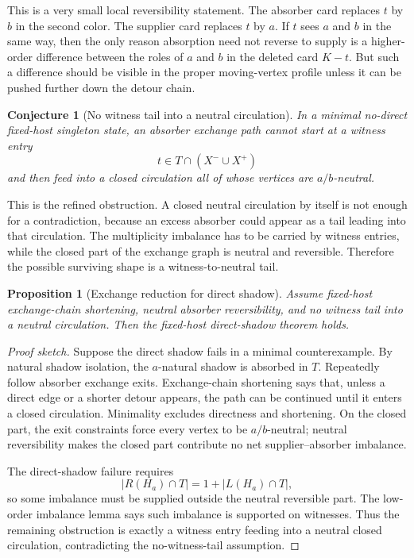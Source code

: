 \documentclass[11pt]{article}
\newtheorem{proposition}{Proposition}
\newtheorem{conjecture}{Conjecture}
\begin{document}
This is a very small local reversibility statement.  The absorber card
replaces \(t\) by \(b\) in the second color.  The supplier card replaces \(t\)
by \(a\).  If \(t\) sees \(a\) and \(b\) in the same way, then the only reason
absorption need not reverse to supply is a higher-order difference between
the roles of \(a\) and \(b\) in the deleted card \(K-t\).  But such a
difference should be visible in the proper moving-vertex profile unless it
can be pushed further down the detour chain.

\begin{conjecture}[No witness tail into a neutral circulation]
In a minimal no-direct fixed-host singleton state, an absorber exchange path
cannot start at a witness entry
\[
  t\in T\cap(X^-\cup X^+)
\]
and then feed into a closed circulation all of whose vertices are
\(a/b\)-neutral.
\end{conjecture}

This is the refined obstruction.  A closed neutral circulation by itself is
not enough for a contradiction, because an excess absorber could appear as a
tail leading into that circulation.  The multiplicity imbalance has to be
carried by witness entries, while the closed part of the exchange graph is
neutral and reversible.  Therefore the possible surviving shape is a
witness-to-neutral tail.

\begin{proposition}[Exchange reduction for direct shadow]
Assume fixed-host exchange-chain shortening, neutral absorber reversibility,
and no witness tail into a neutral circulation.  Then the fixed-host
direct-shadow theorem holds.
\end{proposition}

\begin{proof}[Proof sketch]
Suppose the direct shadow fails in a minimal counterexample.  By natural
shadow isolation, the \(a\)-natural shadow is absorbed in \(T\).  Repeatedly
follow absorber exchange exits.  Exchange-chain shortening says that, unless
a direct edge or a shorter detour appears, the path can be continued until it
enters a closed circulation.  Minimality excludes directness and shortening.
On the closed part, the exit constraints force every vertex to be
\(a/b\)-neutral; neutral reversibility makes the closed part contribute no
net supplier--absorber imbalance.

The direct-shadow failure requires
\[
  |R(H_a)\cap T|=1+|L(H_a)\cap T|,
\]
so some imbalance must be supplied outside the neutral reversible part.  The
low-order imbalance lemma says such imbalance is supported on witnesses.
Thus the remaining obstruction is exactly a witness entry feeding into a
neutral closed circulation, contradicting the no-witness-tail assumption.
\end{proof}
\end{document}
